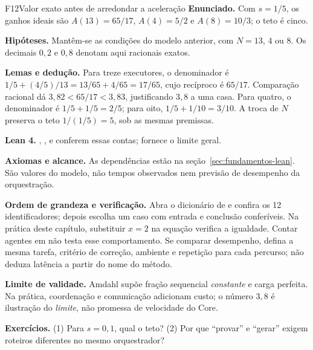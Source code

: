 \begin{formalizacao}{F12}{Valor exato antes de arredondar a aceleração}
\textbf{Enunciado.} Com $s=1/5$, os ganhos ideais são $A(13)=65/17$, $A(4)=5/2$ e $A(8)=10/3$; o teto é cinco.

\textbf{Hipóteses.} Mantêm-se as condições do modelo anterior, com $N=13$, $4$ ou $8$. Os decimais $0{,}2$ e $0{,}8$ denotam aqui racionais exatos.

\textbf{Lemas e dedução.} Para treze executores, o denominador é $1/5+(4/5)/13=13/65+4/65=17/65$, cujo recíproco é $65/17$. Comparação racional dá $3{,}82<65/17<3{,}83$, justificando $3{,}8$ a uma casa. Para quatro, o denominador é $1/5+1/5=2/5$; para oito, $1/5+1/10=3/10$. A troca de $N$ preserva o teto $1/(1/5)=5$, sob as mesmas premissas.

\textbf{Lean 4.} , ,  e  conferem essas contas;  fornece o limite geral.

\textbf{Axiomas e alcance.} As dependências estão na seção~\ref{sec:fundamentos-lean}. São valores do modelo, não tempos observados nem previsão de desempenho da orquestração.
\end{formalizacao}

\begin{resultado}
\textbf{Ordem de grandeza e verificação.} Abra o dicionário de
 e confira os 12 identificadores; depois escolha
um caso com entrada e conclusão conferíveis. Na prática deste capítulo,
substituir $x=2$ na equação verifica a igualdade. Contar agentes em
 não testa esse comportamento. Se comparar desempenho,
defina a mesma tarefa, critério de correção, ambiente e repetição para cada
percurso; não deduza latência a partir do nome do método.
\end{resultado}

\begin{aviso}
\textbf{Limite de validade.} Amdahl supõe fração sequencial \emph{constante} e carga
perfeita. Na prática, coordenação e comunicação adicionam custo; o número $3{,}8$ é
ilustração do \emph{limite}, não promessa de velocidade do Core.
\end{aviso}

\begin{resultado}
\textbf{Exercícios.} (1) Para $s=0{,}1$, qual o teto? (2) Por que ``provar'' e
``gerar'' exigem roteiros diferentes no mesmo orquestrador?
\end{resultado}

